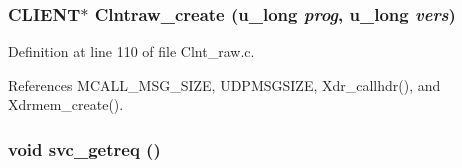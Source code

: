 \subsubsection{\setlength{\rightskip}{0pt plus 5cm}CLIENT$\ast$ Clntraw\_\-create (u\_\-long {\em prog}, u\_\-long {\em vers})}\label{Clnt__raw_8c_a10}




Definition at line 110 of file Clnt\_\-raw.c.

References MCALL\_\-MSG\_\-SIZE, UDPMSGSIZE, Xdr\_\-callhdr(), and Xdrmem\_\-create().
\subsubsection{\setlength{\rightskip}{0pt plus 5cm}void svc\_\-getreq ()}\label{Clnt__raw_8c_a9}


